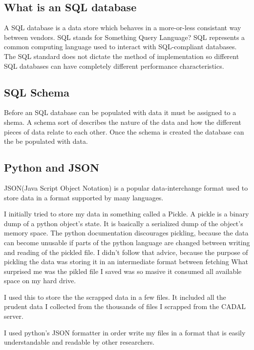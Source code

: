 \subsection{What is an SQL database}

A SQL database is a data store which behaves in a more-or-less consistant way between vendors.  SQL stands for Something Query Language?  SQL represents a common computing language used to interact with SQL-compliant databases.  The SQL standard does not dictate the method of implementation so different SQL databases can have completely different performance characteristics.

\subsection{SQL Schema}

Before an SQL database can be populated with data it must be assigned to a shema.  A schema sort of describes the nature of the data and how the different pieces of data relate to each other.  Once the schema is created the database can the be populated with data.



\subsection{Python and JSON}
JSON(Java Script Object Notation) is a popular data-interchange format used to store data in a format supported by many languages.

I initially tried to store my data in something called a Pickle.  A pickle is a binary dump of a python object's state.  It is basically a serialized dump of the object's memory space.  The python documentation discourages pickling, because the data can become unusable if parts of the python language are changed between writing and reading of the pickled file.  I didn't follow that advice, because the purpose of pickling the data was storing it in an intermediate format between fetching   What surprised me was the pikled file I saved was so masive it consumed all available space on my hard drive.  

I used this to store the the scrapped data in a few files.  It included all the prudent data I collected from the thousands of files I scrapped from the CADAL server.

I used python's JSON formatter in order write my files in a format that is easily understandable and readable by other researchers.

